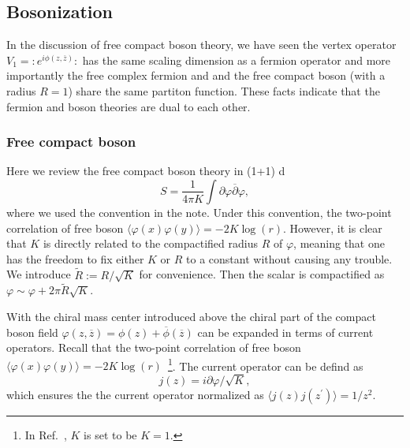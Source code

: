 \subsection{Bosonization}
In the discussion of free compact boson theory, we have seen the vertex operator $V_1 = \mathop{:}e^{i\phi(z,\overline{z})}\mathop{:}$ has the same scaling dimension as a fermion operator and more importantly the free complex fermion and and the free compact boson (with a radius $R=1$) share the same partiton function. These facts indicate that the fermion and boson theories are dual to each other. 

\subsubsection{Free compact boson}
Here we review the free compact boson theory in (1+1) d
\begin{equation}
	S = \frac{1}{4\pi K} \int \partial \varphi \overline{\partial}\varphi,
\end{equation}
where we used the convention in the note. Under this convention, the two-point correlation of free boson $\langle \varphi (x) \varphi(y) \rangle = -2 K \log (r)$. However, it is clear that $K$ is directly related to the compactified radius $R$ of $\varphi$, meaning that one has the freedom to fix either $K$ or $R$ to a constant without causing any trouble. We introduce $\tilde{R} := R/\sqrt{K}$ for convenience. Then the scalar is compactified as $\varphi \sim \varphi + 2\pi \tilde{R}\sqrt{K}$. %

With the chiral mass center introduced above the chiral part of the compact boson field $\varphi(z,\overline{z}) = \phi(z) + \overline{\phi}(\overline{z})$ can be expanded in terms of current operators. Recall that the two-point correlation of free boson $\langle \varphi (x) \varphi(y) \rangle = -2 K \log (r)$~\footnote{In Ref.~\cite{Blumenhagen:2009zz}, $K$ is set to be $K=1$.}. The current operator can be defind as 
\begin{equation}
	j(z) = i \partial \varphi/\sqrt{K},
\end{equation} 
which ensures the the current operator normalized as $\langle j(z) j(z^\prime) \rangle = 1/z^2$.

